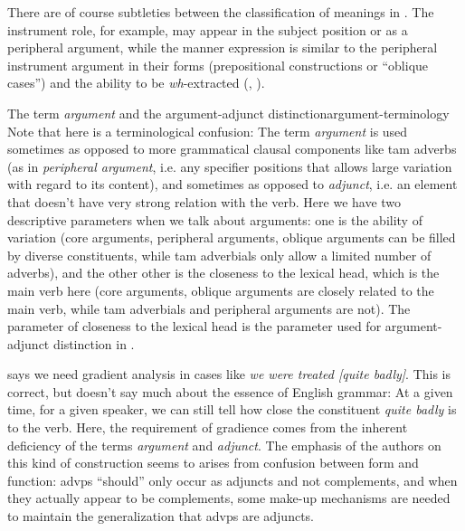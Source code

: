 \documentclass[UTF8, a4paper, oneside, scheme=plain, 12pt]{ctexbook}
\newcommand*{\citepage}[1]{p.~{#1}}
\newcommand*{\term}[1]{\emph{#1}}
\newcommand{\form}[1]{\emph{#1}}
\begin{document}
There are of course subtleties between the classification of meanings in .
The instrument role, for example, 
may appear in the subject position or as a peripheral argument, 
while the manner expression is similar to the peripheral instrument argument 
in their forms (prepositional constructions or ``oblique cases'')
and the ability to be \form{wh}-extracted
(, ).


\begin{infobox}{The term \term{argument} and the argument-adjunct distinction}{argument-terminology}
    Note that here is a terminological confusion:
    The term \term{argument} is used sometimes 
    as opposed to more grammatical clausal components like \acs{tam} adverbs
    (as in \term{peripheral argument}, 
    i.e. any specifier positions that allows large variation with regard to its content),
    and sometimes as opposed to \term{adjunct},
    i.e. an element that doesn't have very strong relation with the verb.
    Here we have two descriptive parameters when we talk about arguments:
    one is the ability of variation
    (core arguments, peripheral arguments, oblique arguments can be filled by diverse constituents,
    while \acs{tam} adverbials only allow a limited number of adverbs),
    and the other other is the closeness to the lexical head, which is the main verb here 
    (core arguments, oblique arguments are closely related to the main verb,
    while \acs{tam} adverbials and peripheral arguments are not).
    The parameter of closeness to the lexical head is the parameter used for argument-adjunct distinction
    in .

    \citet[\citepage{732}]{quirk1985} says we need gradient analysis 
    in cases like \form{we were treated [quite badly]}.
    This is correct, but doesn't say much about the essence of English grammar:
    At a given time, for a given speaker,
    we can still tell how close the constituent \form{quite badly} is to the verb.
    Here, the requirement of gradience 
    comes from the inherent deficiency of the terms \term{argument} and \term{adjunct}. 
    The emphasis of the authors on this kind of construction 
    seems to arises from confusion between form and function:
    \acs{advp}s ``should'' only occur as adjuncts and not complements,
    and when they actually appear to be complements,
    some make-up mechanisms are needed to maintain the generalization that \acs{advp}s are adjuncts.
\end{infobox}
\end{document}
